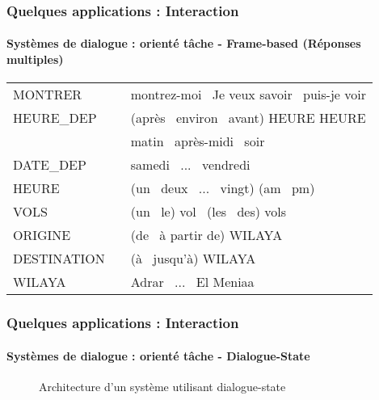 \documentclass[xcolor=table]{beamer}
\begin{document}
\begin{frame}
	\frametitle{Quelques applications : Interaction}
	\framesubtitle{Systèmes de dialogue : orienté tâche - Frame-based (Réponses multiples)}
	
		\centering\footnotesize
		\begin{tabular}{lll}
			MONTRER & \textrightarrow & montrez-moi \textbar\ Je veux savoir \textbar\ puis-je voir \\
			HEURE\_DEP & \textrightarrow & (après \textbar\ environ \textbar\ avant) HEURE \textbar HEURE \textbar\\
			&  & matin \textbar\ après-midi \textbar\ soir\\
			DATE\_DEP & \textrightarrow & samedi \textbar\ ... \textbar\ vendredi\\
			HEURE & \textrightarrow & (un \textbar\ deux \textbar\ ... \textbar\ vingt) (am \textbar\ pm) \\
			VOLS & \textrightarrow & (un \textbar\ le) vol \textbar\ (les \textbar\ des) vols \\
			ORIGINE & \textrightarrow & (de \textbar\ à partir de) WILAYA \\
			DESTINATION & \textrightarrow & (à \textbar\ jusqu'à) WILAYA \\
			WILAYA & \textrightarrow & Adrar \textbar\ ... \textbar\ El Meniaa \\
		\end{tabular}
		
	
\end{frame}

\begin{frame}
	\frametitle{Quelques applications : Interaction}
	\framesubtitle{Systèmes de dialogue : orienté tâche - Dialogue-State}
	
	\begin{figure}
		\centering
		\caption{Architecture d'un système utilisant dialogue-state \cite{2016-williams-al}}
	\end{figure}
	
\end{frame}
\end{document}
